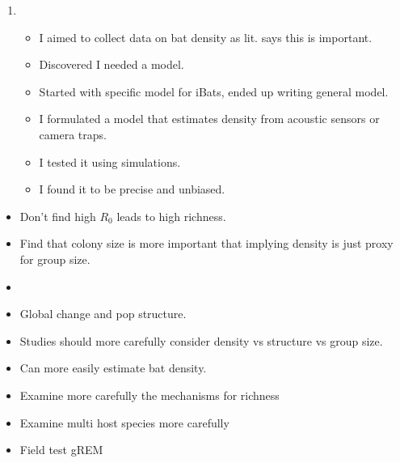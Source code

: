 \begin{enumerate}
\item
\begin{itemize}
\item I aimed to collect data on bat density as lit. says this is important.
\item Discovered I needed a model.
\item Started with specific model for iBats, ended up writing general model.
\item I formulated a model that estimates density from acoustic sensors or camera traps.
\item I tested it using simulations.
\item I found it to be precise and unbiased.
\end{itemize}

\end{enumerate}








\begin{itemize}
\item Don't find high $R_0$ leads to high richness.
\item Find that colony size is more important that implying density is just proxy for group size.
\item 


\end{itemize}







\begin{itemize}
\item Global change and pop structure.
\item Studies should more carefully consider density vs structure vs group size.
\item Can more easily estimate bat density.

\end{itemize}






\begin{itemize}
\item Examine more carefully the mechanisms for richness
\item Examine multi host species more carefully
\item Field test gREM
\end{itemize}


